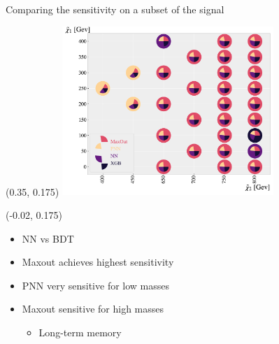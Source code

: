 \documentclass[UKenglish]{beamer}
\begin{document}

\begin{frame}{Comparing the sensitivity on a subset of the signal}
    \begin{textblock}{1}(0.35, 0.175)
    \includegraphics[width=0.6\textwidth]{figures/Comps/GenPlussXGBNetworkComp.pdf}
    \end{textblock}
    \begin{textblock}{0.4}(-0.02, 0.175)
        \begin{itemize}
            \item NN vs BDT
            \item Maxout achieves highest sensitivity
            \item PNN very sensitive for low masses 
            \item Maxout sensitive for high masses 
            \begin{itemize}
                \item Long-term memory
            \end{itemize}
        \end{itemize}
    \end{textblock}
\end{frame}
\end{document}
